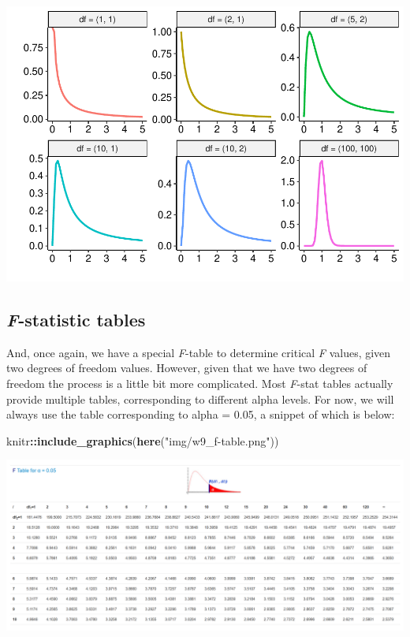 \documentclass[
]{book}
\newenvironment{Shaded}{\begin{snugshade}}{\end{snugshade}}
\newcommand{\FunctionTok}[1]{\textcolor[rgb]{0.13,0.29,0.53}{\textbf{#1}}}
\newcommand{\NormalTok}[1]{#1}
\newcommand{\SpecialCharTok}[1]{\textcolor[rgb]{0.81,0.36,0.00}{\textbf{#1}}}
\newcommand{\StringTok}[1]{\textcolor[rgb]{0.31,0.60,0.02}{#1}}
\begin{document}
\includegraphics{_main_files/figure-latex/unnamed-chunk-166-1.pdf}

\subsection{\texorpdfstring{\emph{F}-statistic tables}{F-statistic tables}}\label{f-statistic-tables}

And, once again, we have a special \emph{F}-table to determine critical \emph{F}
values, given two degrees of freedom values. However, given that we have
two degrees of freedom the process is a little bit more complicated.
Most \emph{F}-stat tables actually provide multiple tables, corresponding to
different alpha levels. For now, we will always use the table
corresponding to alpha = 0.05, a snippet of which is below:

\begin{Shaded}
\begin{Highlighting}[]
\NormalTok{knitr}\SpecialCharTok{::}\FunctionTok{include\_graphics}\NormalTok{(}\FunctionTok{here}\NormalTok{(}\StringTok{"img/w9\_f{-}table.png"}\NormalTok{))}
\end{Highlighting}
\end{Shaded}

\includegraphics{img/w9_f-table.png}
\end{document}
